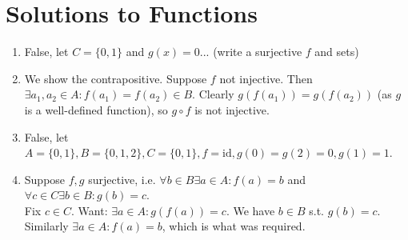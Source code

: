 \documentclass[10pt,a4paper]{article}
\begin{document}
\section{Solutions to Functions}
\begin{enumerate}
	\item False, let \( C = \{0,1\} \) and \(g(x) = 0\)... (write a surjective \(f\) and sets)
	\item We show the contrapositive. Suppose \(f\) not injective. Then \(\exists a_1, a_2 \in A : f(a_1) = f(a_2) \in B \). Clearly \( g(f(a_1)) = g(f(a_2)) \) (as \(g\) is a well-defined function), so \(g\circ f\) is not injective.
	\item False, let \( A = \{0, 1\}, B = \{0,1,2\}, C=\{0,1\}, f=\mathrm{id}, g(0)=g(2)=0, g(1)=1 \).
	\item Suppose \(f, g\) surjective, i.e. \( \forall b \in B \exists a \in A : f(a) = b \) and \( \forall c \in C \exists b \in B : g(b) = c \).\\
	Fix \( c \in C\). Want: \( \exists a \in A : g(f(a)) = c \). We have \(b \in B\) s.t. \( g(b) = c \). Similarly \( \exists a \in A : f(a) = b \), which is what was required.
\end{enumerate}
\end{document}
